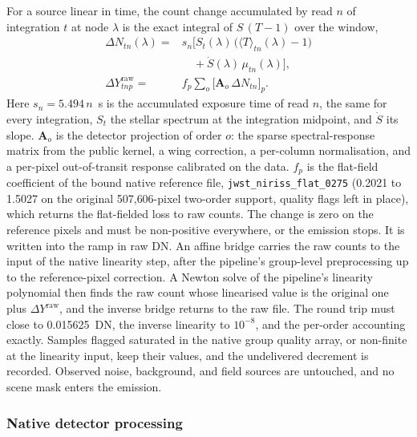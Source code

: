 For a source linear in time, the count change accumulated by read $n$ of
integration $t$ at node $\lambda$ is the exact integral of $S\,(T-1)$
over the window,
\begin{equation}
\begin{split}
 \Delta N_{tn}(\lambda) = {}& s_n\big[S_t(\lambda)\,
 \big(\langle T\rangle_{tn}(\lambda)-1\big) \\
 &\quad +\dot S(\lambda)\,\mu_{tn}(\lambda)\big], \\
 \Delta Y^{\mathrm{raw}}_{tnp} = {}& f_p
 \sum_{o}\big[\bm{A}_o\,\Delta N_{tn}\big]_p .
\end{split}
 \label{eq:v45-injector}
\end{equation}
Here $s_n=5.494\,n$~s is the accumulated exposure time of read $n$, the
same for every integration, $S_t$ the stellar spectrum at the
integration midpoint, and $\dot S$ its slope. $\bm{A}_o$ is the detector
projection of order $o$: the sparse spectral-response matrix from the
public kernel, a wing correction, a per-column normalisation, and a
per-pixel out-of-transit response calibrated on the data. $f_p$ is the
flat-field coefficient of the bound native reference file,
\texttt{jwst\_niriss\_flat\_0275} (0.2021 to 1.5027 on the original
507{,}606-pixel two-order support, quality flags left in place), which
returns the flat-fielded loss to raw counts. The change is zero on the
reference pixels and must be non-positive everywhere, or the emission
stops. It is written into the ramp in raw DN. An affine bridge carries
the raw counts to the input of the native linearity step, after the
pipeline's group-level preprocessing up to the reference-pixel
correction. A Newton solve of the pipeline's linearity polynomial then
finds the raw count whose linearised value is the original one plus
$\Delta Y^{\mathrm{raw}}$, and the inverse bridge returns to the raw
file. The round trip must close to
0.015625~DN, the inverse linearity to $10^{-8}$, and the per-order
accounting exactly. Samples flagged saturated in the native group
quality array, or non-finite at the linearity input, keep their values,
and the undelivered decrement is recorded. Observed noise, background,
and field sources are untouched, and no scene mask enters the emission.

\subsubsection{Native detector processing}


